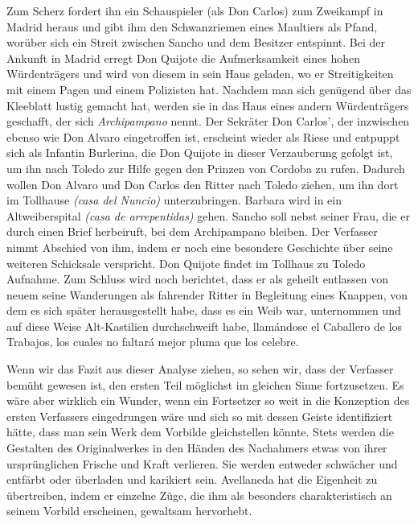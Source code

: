 Zum Scherz fordert ihn ein Schauspieler (als Don Carlos) zum
Zweikampf in Madrid heraus und gibt ihm den Schwanzriemen eines
Maultiers als Pfand, worüber sich ein Streit zwischen Sancho und dem
Besitzer entspinnt. Bei der Ankunft in Madrid erregt Don Quijote
die Aufmerksamkeit eines hohen Würdenträgers und wird von diesem
in sein Haus geladen, wo er Streitigkeiten mit einem Pagen und einem
Polizisten hat. Nachdem man sich genügend über das Kleeblatt lustig
gemacht hat, werden sie in das Haus eines andern Würdenträgers geschafft,
der sich {\it Archipampano} nennt. Der Sekräter Don Carlos', der
inzwischen ebenso wie Don Alvaro eingetroffen ist, erscheint wieder als
Riese und entpuppt sich als Infantin Burlerina, die Don Quijote in dieser
Verzauberung gefolgt ist, um ihn nach Toledo zur Hilfe gegen den
Prinzen von Cordoba zu rufen. Dadurch wollen Don Alvaro und Don
Carlos den Ritter nach Toledo ziehen, um ihn dort im Tollhause {\it\spanish (casa
del Nuncio)} unterzubringen. Barbara wird in ein Altweiberspital {\it\spanish (casa
de arrepentidas)} gehen. Sancho soll nebst seiner Frau, die er durch
einen Brief herbeiruft, bei dem Archipampano bleiben. Der Verfasser
nimmt Abschied von ihm, indem er noch eine besondere Geschichte
über seine weiteren Schicksale verspricht.
Don Quijote findet im Tollhaus zu Toledo Aufnahme. Zum Schluss
wird noch berichtet, dass er als geheilt entlassen von neuem seine Wanderungen
als fahrender Ritter in Begleitung eines Knappen, von dem es
sich später herausgestellt habe, dass es ein Weib war, unternommen
und auf diese Weise Alt-Kastilien durchschweift habe, {\itquoted\spanish llamándose el
Caballero de los Trabajos, los cuales no faltará mejor pluma que los
celebre}.

Wenn wir das Fazit aus dieser Analyse ziehen, so sehen wir, dass
der Verfasser bemüht gewesen ist, den ersten Teil möglichst im gleichen
Sinne fortzusetzen. Es wäre aber wirklich ein Wunder, wenn ein Fortsetzer
so weit in die Konzeption des ersten Verfassers eingedrungen
wäre und sich so mit dessen Geiste identifiziert hätte, dass man sein
Werk dem Vorbilde gleichstellen könnte. Stets werden die Gestalten
des Originalwerkes in den Händen des Nachahmers etwas von ihrer
ursprünglichen Frische und Kraft verlieren. Sie werden entweder
schwächer und entfärbt oder überladen und karikiert sein. Avellaneda
hat die Eigenheit zu übertreiben, indem er einzelne Züge, die ihm
als besonders charakteristisch an seinem Vorbild erscheinen, gewaltsam
hervorhebt.

